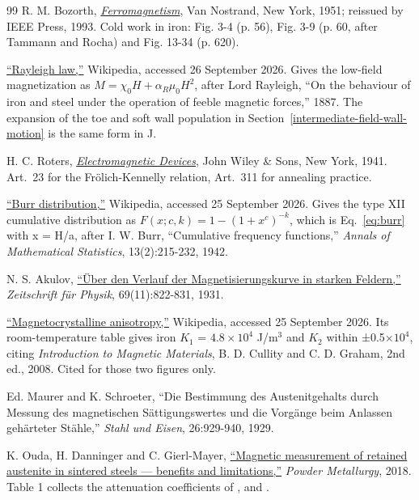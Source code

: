 \documentclass[
  11pt,
]{article}
\begin{document}
\begin{thebibliography}{99}\label{references}
 R. M. Bozorth, \href{https://doi.org/10.1109/9780470544624}{\emph{Ferromagnetism}}, Van Nostrand, New York, 1951; reissued by IEEE Press, 1993. Cold work in iron: Fig. 3-4 (p. 56), Fig. 3-9 (p. 60, after Tammann and Rocha) and Fig. 13-34 (p. 620).

 \href{https://en.wikipedia.org/wiki/Rayleigh_law}{``Rayleigh law,''} Wikipedia, accessed 26 September 2026. Gives the low-field magnetization as \(M = \chi_0 H + \alpha_R \mu_0 H^{2}\), after Lord Rayleigh, ``On the behaviour of iron and steel under the operation of feeble magnetic forces,'' 1887. The expansion of the toe and soft wall population in Section~\ref{intermediate-field-wall-motion} is the same form in J.

 H. C. Roters, \href{https://archive.org/details/in.ernet.dli.2015.205551}{\emph{Electromagnetic Devices}}, John Wiley \& Sons, New York, 1941. Art.~23 for the Frölich-Kennelly relation, Art.~311 for annealing practice.

 \href{https://en.wikipedia.org/wiki/Burr_distribution}{``Burr distribution,''} Wikipedia, accessed 25 September 2026. Gives the type XII cumulative distribution as \(F(x;c,k) = 1-(1+x^{c})^{-k}\), which is Eq.~\eqref{eq:burr} with x = H/a, after I. W. Burr, ``Cumulative frequency functions,'' \emph{Annals of Mathematical Statistics}, 13(2):215-232, 1942.

 N. S. Akulov, \href{https://link.springer.com/article/10.1007/BF01339465}{``Über den Verlauf der Magnetisierungskurve in starken Feldern,''} \emph{Zeitschrift für Physik}, 69(11):822-831, 1931.

 \href{https://en.wikipedia.org/wiki/Magnetocrystalline_anisotropy}{``Magnetocrystalline anisotropy,''} Wikipedia, accessed 25 September 2026. Its room-temperature table gives iron \(K_1\) = \(4.8\times10^{4}\) J/m\(^{3}\) and \(K_2\) within ±0.5\(\times10^{4}\), citing \emph{Introduction to Magnetic Materials}, B. D. Cullity and C. D. Graham, 2nd ed., 2008. Cited for those two figures only.

 Ed. Maurer and K. Schroeter, ``Die Bestimmung des Austenitgehalts durch Messung des magnetischen Sättigungswertes und die Vorgänge beim Anlassen gehärteter Stähle,'' \emph{Stahl und Eisen}, 26:929-940, 1929.

 K. Ouda, H. Danninger and C. Gierl-Mayer, \href{https://doi.org/10.1080/00325899.2018.1530850}{``Magnetic measurement of retained austenite in sintered steels --- benefits and limitations,''} \emph{Powder Metallurgy}, 2018. Table 1 collects the attenuation coefficients of \cite{maurer1929}, \cite{exner1960} and \cite{hoselitz1952}.


\end{thebibliography}
\end{document}
